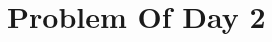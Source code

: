 \documentclass{article}
\newcommand{\YearPath}{../../../LatexConfig} %
\newcommand{\SemesterPath}{../../LatexConfig} %
\newcommand{\ClassPath}{../LatexConfig} %
\begin{document}




\section{Problem Of Day 2}





\end{document}

